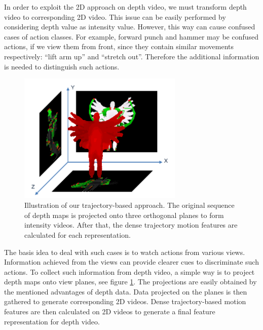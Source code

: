 \documentclass[review]{elsarticle}
\begin{document}
In order to exploit the 2D approach on depth video, we must transform depth video to corresponding 2D video.
This issue can be easily performed by considering depth value as intensity value.
However, this way can cause confused cases of action classes.
For example, forward punch and hammer may be confused actions, if we view them from front, since they contain similar movements respectively: “lift arm up” and “stretch out”.
Therefore the additional information is needed to distinguish such actions.

\begin{figure}[H]
	\begin{center}
		\includegraphics[width=0.7\textwidth]{Projections.png}
	\end{center}
	\caption{\label{lbl:Figure_ProposedMethod}Illustration of our trajectory-based approach. The original sequence of depth maps is projected onto three orthogonal planes to form intensity videos. After that, the dense trajectory motion features are calculated for each representation.}
\end{figure}

The basis idea to deal with such cases is to watch actions from various views.
Information achieved from the views can provide clearer cues to discriminate such actions.
To collect such information from depth video, a simple way is to project depth maps onto view planes, see figure \ref{lbl:Figure_ProposedMethod}.
The projections are easily obtained by the mentioned advantages of depth data.
Data projected on the planes is then gathered to generate corresponding 2D videos.
Dense trajectory-based motion features are then calculated on 2D videos to generate a final feature representation for depth video.
\end{document}
